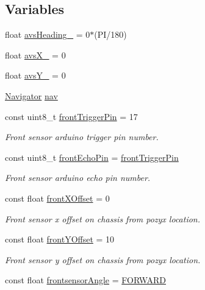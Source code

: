 \subsection*{Variables}
\begin{DoxyCompactItemize}
\item 
float \mbox{\hyperlink{bot_main_8ino_a26ae4f60d3d4ebfa68763710b6f20e7c}{avs\+Heading\+\_\+}} = 0$\ast$(PI/180)
\item 
float \mbox{\hyperlink{bot_main_8ino_a36b5ddac5fd4781d96ab1f7afb628e63}{avs\+X\+\_\+}} = 0
\item 
float \mbox{\hyperlink{bot_main_8ino_aa4d40143b7595abf8807c96ac5fd82e2}{avs\+Y\+\_\+}} = 0
\item 
\mbox{\hyperlink{class_navigator}{Navigator}} \mbox{\hyperlink{bot_main_8ino_a4d757d2a3d2bcf4b98f6f4a72d7df7de}{nav}}
\item 
const uint8\+\_\+t \mbox{\hyperlink{bot_main_8ino_a33df7a8dbfd90327fda79c01f944f56a}{front\+Trigger\+Pin}} = 17
\begin{DoxyCompactList}\small\item\em Front sensor arduino trigger pin number. \end{DoxyCompactList}\item 
const uint8\+\_\+t \mbox{\hyperlink{bot_main_8ino_a878ae4b68ec48fc902c4aa953ad565b4}{front\+Echo\+Pin}} = \mbox{\hyperlink{bot_main_8ino_a33df7a8dbfd90327fda79c01f944f56a}{front\+Trigger\+Pin}}
\begin{DoxyCompactList}\small\item\em Front sensor arduino echo pin number. \end{DoxyCompactList}\item 
const float \mbox{\hyperlink{bot_main_8ino_abdd898a2dfa2f64e2821af36c6ed3724}{front\+X\+Offset}} = 0
\begin{DoxyCompactList}\small\item\em Front sensor x offset on chassis from pozyx location. \end{DoxyCompactList}\item 
const float \mbox{\hyperlink{bot_main_8ino_a4919465d0182f44aa7acaa39ece1e17a}{front\+Y\+Offset}} = 10
\begin{DoxyCompactList}\small\item\em Front sensor y offset on chassis from pozyx location. \end{DoxyCompactList}\item 
const float \mbox{\hyperlink{bot_main_8ino_ad681cfe410d5d764c513368773b9de93}{frontsensor\+Angle}} = \mbox{\hyperlink{bot_main_8ino_a6ddfdda7a062d10cff4a72b76b44aeb8}{F\+O\+R\+W\+A\+RD}}

\end{DoxyCompactItemize}
